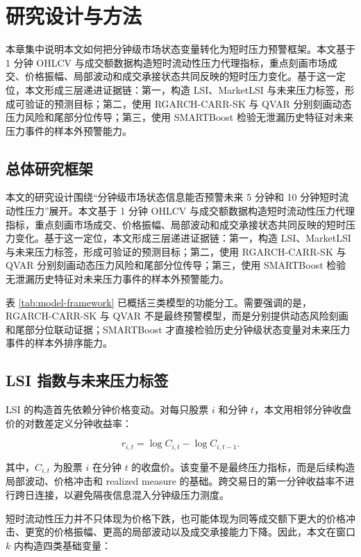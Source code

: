 \section{研究设计与方法}

本章集中说明本文如何把分钟级市场状态变量转化为短时压力预警框架。本文基于 1 分钟 OHLCV 与成交额数据构造短时流动性压力代理指标，重点刻画市场成交、价格振幅、局部波动和成交承接状态共同反映的短时压力变化。基于这一定位，本文形成三层递进证据链：第一，构造 LSI、MarketLSI 与未来压力标签，形成可验证的预测目标；第二，使用 RGARCH-CARR-SK 与 QVAR 分别刻画动态压力风险和尾部分位传导；第三，使用 SMARTBoost 检验无泄漏历史特征对未来压力事件的样本外预警能力。

\subsection{总体研究框架}

本文的研究设计围绕“分钟级市场状态信息能否预警未来 5 分钟和 10 分钟短时流动性压力”展开。本文基于 1 分钟 OHLCV 与成交额数据构造短时流动性压力代理指标，重点刻画市场成交、价格振幅、局部波动和成交承接状态共同反映的短时压力变化。基于这一定位，本文形成三层递进证据链：第一，构造 LSI、MarketLSI 与未来压力标签，形成可验证的预测目标；第二，使用 RGARCH-CARR-SK 与 QVAR 分别刻画动态压力风险和尾部分位传导；第三，使用 SMARTBoost 检验无泄漏历史特征对未来压力事件的样本外预警能力。

表 \ref{tab:model-framework} 已概括三类模型的功能分工。需要强调的是，RGARCH-CARR-SK 与 QVAR 不是最终预警模型，而是分别提供动态风险刻画和尾部分位联动证据；SMARTBoost 才直接检验历史分钟级状态变量对未来压力事件的样本外排序能力。

\subsection{LSI 指数与未来压力标签}

LSI 的构造首先依赖分钟价格变动。对每只股票 $i$ 和分钟 $t$，本文用相邻分钟收盘价的对数差定义分钟收益率：

\begin{equation}
r_{i,t}=\log C_{i,t}-\log C_{i,t-1}.
\end{equation}

其中，$C_{i,t}$ 为股票 $i$ 在分钟 $t$ 的收盘价。该变量不是最终压力指标，而是后续构造局部波动、价格冲击和 realized measure 的基础。跨交易日的第一分钟收益率不进行跨日连接，以避免隔夜信息混入分钟级压力测度。

短时流动性压力并不只体现为价格下跌，也可能体现为同等成交额下更大的价格冲击、更宽的价格振幅、更高的局部波动以及成交承接能力下降。因此，本文在窗口 $k$ 内构造四类基础变量：

